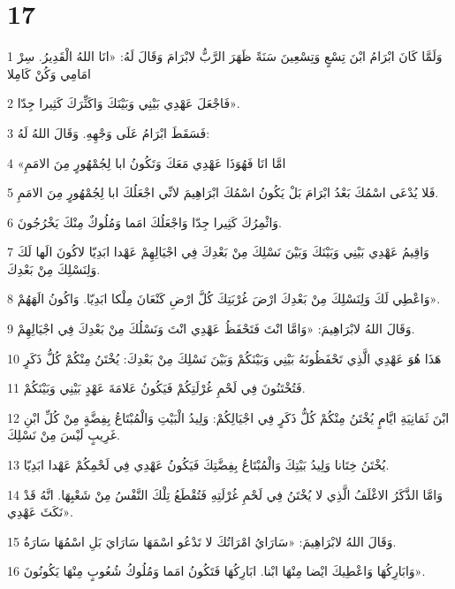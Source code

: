 \chapter{17}

\par 1 وَلَمَّا كَانَ ابْرَامُ ابْنَ تِسْعٍ وَتِسْعِينَ سَنَةً ظَهَرَ الرَّبُّ لابْرَامَ وَقَالَ لَهُ: «انَا اللهُ الْقَدِيرُ. سِرْ امَامِي وَكُنْ كَامِلا
\par 2 فَاجْعَلَ عَهْدِي بَيْنِي وَبَيْنَكَ وَاكَثِّرَكَ كَثِيرا جِدّا».
\par 3 فَسَقَطَ ابْرَامُ عَلَى وَجْهِهِ. وَقَالَ اللهُ لَهُ:
\par 4 «امَّا انَا فَهُوَذَا عَهْدِي مَعَكَ وَتَكُونُ ابا لِجُمْهُورٍ مِنَ الامَمِ
\par 5 فَلا يُدْعَى اسْمُكَ بَعْدُ ابْرَامَ بَلْ يَكُونُ اسْمُكَ ابْرَاهِيمَ لانِّي اجْعَلُكَ ابا لِجُمْهُورٍ مِنَ الامَمِ.
\par 6 وَاثْمِرُكَ كَثِيرا جِدّا وَاجْعَلُكَ امَما وَمُلُوكٌ مِنْكَ يَخْرُجُونَ.
\par 7 وَاقِيمُ عَهْدِي بَيْنِي وَبَيْنَكَ وَبَيْنَ نَسْلِكَ مِنْ بَعْدِكَ فِي اجْيَالِهِمْ عَهْدا ابَدِيّا لاكُونَ الَها لَكَ وَلِنَسْلِكَ مِنْ بَعْدِكَ.
\par 8 وَاعْطِي لَكَ وَلِنَسْلِكَ مِنْ بَعْدِكَ ارْضَ غُرْبَتِكَ كُلَّ ارْضِ كَنْعَانَ مِلْكا ابَدِيّا. وَاكُونُ الَهَهُمْ».
\par 9 وَقَالَ اللهُ لابْرَاهِيمَ: «وَامَّا انْتَ فَتَحْفَظُ عَهْدِي انْتَ وَنَسْلُكَ مِنْ بَعْدِكَ فِي اجْيَالِهِمْ.
\par 10 هَذَا هُوَ عَهْدِي الَّذِي تَحْفَظُونَهُ بَيْنِي وَبَيْنَكُمْ وَبَيْنَ نَسْلِكَ مِنْ بَعْدِكَ: يُخْتَنُ مِنْكُمْ كُلُّ ذَكَرٍ
\par 11 فَتُخْتَنُونَ فِي لَحْمِ غُرْلَتِكُمْ فَيَكُونُ عَلامَةَ عَهْدٍ بَيْنِي وَبَيْنَكُمْ.
\par 12 ابْنَ ثَمَانِيَةِ ايَّامٍ يُخْتَنُ مِنْكُمْ كُلُّ ذَكَرٍ فِي اجْيَالِكُمْ: وَلِيدُ الْبَيْتِ وَالْمُبْتَاعُ بِفِضَّةٍ مِنْ كُلِّ ابْنِ غَرِيبٍ لَيْسَ مِنْ نَسْلِكَ.
\par 13 يُخْتَنُ خِتَانا وَلِيدُ بَيْتِكَ وَالْمُبْتَاعُ بِفِضَّتِكَ فَيَكُونُ عَهْدِي فِي لَحْمِكُمْ عَهْدا ابَدِيّا.
\par 14 وَامَّا الذَّكَرُ الاغْلَفُ الَّذِي لا يُخْتَنُ فِي لَحْمِ غُرْلَتِهِ فَتُقْطَعُ تِلْكَ النَّفْسُ مِنْ شَعْبِهَا. انَّهُ قَدْ نَكَثَ عَهْدِي».
\par 15 وَقَالَ اللهُ لابْرَاهِيمَ: «سَارَايُ امْرَاتُكَ لا تَدْعُو اسْمَهَا سَارَايَ بَلِ اسْمُهَا سَارَةُ.
\par 16 وَابَارِكُهَا وَاعْطِيكَ ايْضا مِنْهَا ابْنا. ابَارِكُهَا فَتَكُونُ امَما وَمُلُوكُ شُعُوبٍ مِنْهَا يَكُونُونَ».
